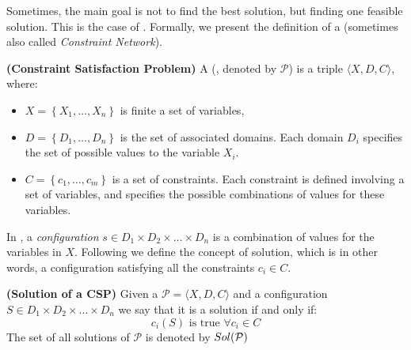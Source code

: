 Sometimes, the main goal is not to find the best solution, but finding one feasible solution. This is the case of \CSPs. Formally, we present the definition of a \csp{} (sometimes also called \textit{Constraint Network}). 

\begin{definition}{\bf (Constraint Satisfaction Problem)}
\label{def:csp}
A \CSP{} (\csp, denoted by $\mathcal{P}$) is a triple $\langle X,D,C \rangle$, where:
\begin{itemize}
\item $X = \left\{X_1,\ldots,X_n\right\}$ is finite a set of variables,
\item $D = \left\{D_1,\ldots, D_n\right\}$ is the set of associated domains. Each domain $D_i$ specifies the set of possible values to the variable $X_i$. %
\item $C = \left\{c_1,\ldots, c_m\right\}$ is a set of constraints. Each constraint is defined involving a set of variables, and specifies the possible combinations of values for these variables.
\end{itemize}
\end{definition}


In \csps, a \textit{configuration} $s\in D_1\times D_2\times\dots\times D_n$ is a combination of values for the variables in $X$. Following we define the concept of solution, which is in other words, a configuration satisfying all the constraints $c_i \in C$.

\begin{definition}{\bf (Solution of a CSP)}
\label{solCSP}
Given a \csp{} $\mathcal{P}=\langle X,D,C \rangle$ and a configuration $S \in D_1\times D_2\times\dots\times D_n$ we say that it is a solution if and only if:	
\begin{equation*}
c_i\left(S\right)\text{ is true }\forall c_i \in C
\end{equation*}
The set of all solutions of $\mathcal{P}$ is denoted by $\mathnormal{Sol}(\mathcal{P})$
\end{definition}

